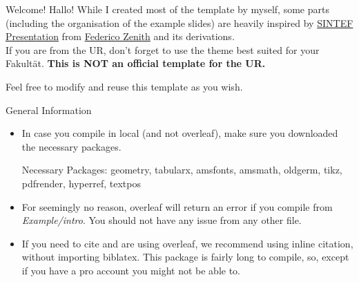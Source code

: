 \begin{frame}{Welcome!}
    Hallo! While I created most of the template by myself, some parts (including the organisation of the example slides) are heavily inspired by \href{https://www.overleaf.com/latex/templates/sintef-presentation/jhbhdffczpnx}{SINTEF Presentation} from \href{mailto:federico.zenith@sintef.no}{Federico Zenith} and its derivations.\\
    If you are from the UR, don't forget to use the theme best suited for your Fakultät. \textbf{This is NOT an official template for the UR.}
    
    \vspace{\baselineskip}
    
    Feel free to modify and reuse this template as you wish.
\end{frame}

\begin{frame}{General Information}
\begin{itemize}
    \item  In case you compile in local (and not overleaf), make sure you downloaded the necessary packages.
        \begin{block}{Necessary Packages:}
            geometry, tabularx, amsfonts, amsmath, oldgerm, tikz, pdfrender, hyperref, textpos
        \end{block}
        \item For seemingly no reason, overleaf will return an error if you compile from \emph{Example/intro}. You should not have any issue from any other file.
        \item If you need to cite and are using overleaf, we recommend using inline citation, without importing biblatex. This package is fairly long to compile, so, except if you have a pro account you might not be able to.
\end{itemize}
\end{frame}




